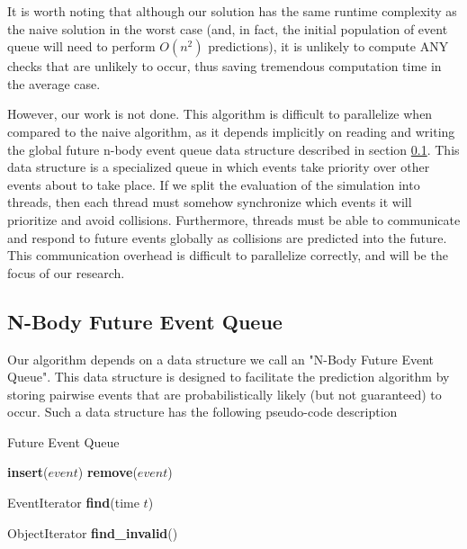 \documentclass[CEJCS,PDF]{cej} %
\begin{document}
It is worth noting that although our solution has the same runtime complexity as the naive solution in the worst case (and, in fact, the initial population of event queue will need to perform $O(n^2)$ predictions), it is unlikely to compute ANY checks that are unlikely to occur, thus saving tremendous computation time in the average case.  

However, our work is not done.  This algorithm is difficult to parallelize when compared to the naive algorithm, as it depends implicitly on reading and writing the global future n-body event queue data structure described in section \ref{sec:neq}.  This data structure is a specialized queue in which events take priority over other events about to take place. If we split the evaluation of the simulation into threads, then each thread must somehow synchronize which events it will prioritize and avoid collisions.  Furthermore, threads must be able to communicate and respond to future events  globally as collisions are predicted into the future.  This communication overhead is difficult to parallelize correctly, and will be the focus of our research.

\subsection{N-Body Future Event Queue}
\label{sec:neq}
Our algorithm depends on a data structure we call an "N-Body Future Event Queue".  This data structure is designed to facilitate the prediction algorithm
by storing pairwise events that are probabilistically likely (but not guaranteed) to occur.  Such a data structure has the following pseudo-code description

\begin{algorithm}
\caption{Future Event Queue} %
\begin{algorithmic}
\STATE {}
\STATE \textbf{insert}($event$)
\STATE {}
\STATE \textbf{remove}($event$)
	
\STATE {}
\STATE EventIterator \textbf{find}(time $t$)

\STATE {}
\STATE ObjectIterator \textbf{find\_invalid}()
\end{algorithmic}
\end{algorithm}
\end{document}
